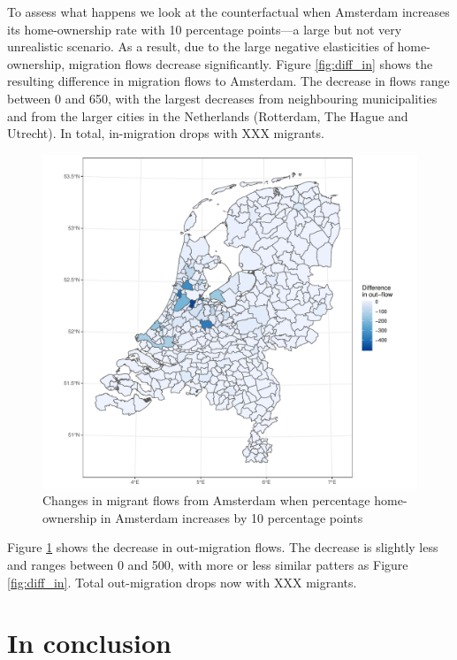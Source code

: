 \documentclass[fleqn,10pt]{SelfArx} %
\begin{document}
{{To assess what happens we look at the counterfactual when Amsterdam increases its home-ownership rate with 10 percentage points---a large but not very unrealistic scenario. 
As a result, due to the large negative elasticities of home-ownership, migration flows decrease significantly. Figure \ref{fig:diff_in} shows the resulting difference in migration flows to Amsterdam.
The decrease in flows range between 0 and 650, with the largest decreases from neighbouring municipalities and from the larger cities in the Netherlands (Rotterdam, The Hague and Utrecht). In total, in-migration drops with XXX migrants.

\begin{figure}
  \centering \includegraphics[width =
  \columnwidth]{../fig/p_diff_out.pdf}
  \caption{Changes in migrant flows from Amsterdam when percentage home-ownership
    in Amsterdam increases by 10  percentage points}\label{fig:diff_out}
\end{figure}

Figure \ref{fig:diff_out} shows the decrease in out-migration flows. The decrease is slightly less and ranges between 0 and 500, with more or less similar patters as Figure \ref{fig:diff_in}. Total out-migration drops now with XXX migrants. 

\section{In conclusion}

}}
\end{document}
